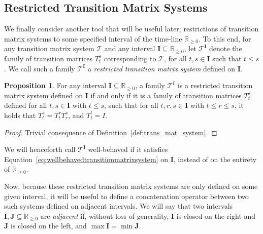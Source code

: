 \documentclass[10pt,a4paper]{paper}
\theoremstyle{definition}
\newtheorem{proposition}[theorem]{Proposition}
\newcommand{\reals}{\mathbb{R}}
\newcommand{\realsnonneg}{\reals_{\geq 0}}
\newcommand{\coloneqq}{:\!=}
\begin{document}
\subsection{Restricted Transition Matrix Systems}

We finally consider another tool that will be useful later; restrictions of transition matrix systems to some specified interval of the time-line $\realsnonneg$. To this end, for any transition matrix system $\mathcal{T}$ and any interval $\mathbf{I}\subseteq\realsnonneg$, let $\mathcal{T}^\mathbf{I}$ denote the family of transition matrices $T_t^s$ corresponding to $\mathcal{T}$, for all $t,s\in\mathbf{I}$ such that $t\leq s$.
We call such a family $\mathcal{T}^{\mathbf{I}}$ a \emph{restricted transition matrix system} defined on $\mathbf{I}$.


\begin{proposition}\label{prop:restr_trans_mat_system_if_semigroup}
For any interval $\mathbf{I}\subseteq\realsnonneg$, a family $\mathcal{T}^{\mathbf{I}}$ is a restricted transition matrix system defined on $\mathbf{I}$ if and only if it is a family of transition matrices $T_t^s$ defined for all $t,s\in\mathbf{I}$ with $t\leq s$, such that for all $t,r,s\in\mathbf{I}$ with $t\leq r\leq s$, it holds that $T_t^s = T_t^rT_r^s$, and $T_t^t=I$.
\end{proposition}
\begin{proof}
Trivial consequence of Definition~\ref{def:trans_mat_system}.
\end{proof}
We will henceforth call $\mathcal{T}^{\mathbf{I}}$ well-behaved if it satisfies Equation~\eqref{eq:wellbehavedtransitionmatrixsystem} on $\mathbf{I}$, instead of on the entirety of $\realsnonneg$.

Now, because these restricted transition matrix systems are only defined on some given interval, it will be useful to define a concatenation operator between two such systems defined on adjacent intervals. We will say that two intervals $\mathbf{I},\mathbf{J}\subseteq\realsnonneg$ are \emph{adjacent} if, without loss of generality, $\mathbf{I}$ is closed on the right and $\mathbf{J}$ is closed on the left, and $\max\mathbf{I}=\min\mathbf{J}$. 
\end{document}
